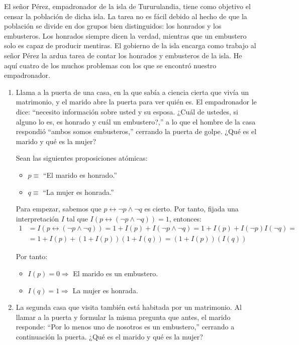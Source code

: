 \begin{ejercicio}\label{ej:1.4}
    El señor Pérez, empadronador de la isla de Tururulandia, tiene como objetivo el censar la población de dicha isla. La tarea no es fácil debido al hecho de que la población se divide en dos grupos bien distinguidos: los honrados y los embusteros. Los honrados siempre dicen la verdad, mientras que un embustero solo es capaz de producir mentiras. El gobierno de la isla encarga como trabajo al señor Pérez la ardua tarea de contar los honrados y embusteros de la isla.
    He aquí cuatro de los muchos problemas con los que se encontró nuestro empadronador.
    \begin{enumerate}
        \item Llama a la puerta de una casa, en la que sabía a ciencia cierta que vivía un matrimonio, y el marido abre la puerta para ver quién es. El empadronador le dice: ``necesito información sobre usted y su esposa. ¿Cuál de ustedes, si alguno lo es, es honrado y cuál un embustero?,'' a lo que el hombre de la casa respondió ``ambos somos embusteros,'' cerrando la puerta de golpe. ¿Qué es el marido y qué es la mujer?
        
        Sean las siguientes proposiciones atómicas:
        \begin{itemize}
            \item $p\equiv$ ``El marido es honrado.''
            \item $q\equiv$ ``La mujer es honrada.''
        \end{itemize}

        Para empezar, sabemos que $p\longleftrightarrow \neg p\land \neg q$ es cierto. Por tanto, fijada una interpretación $I$ tal que $I(p\longleftrightarrow (\neg p\land \neg q))=1$, entonces:
        \begin{align*}
            1 &= I(p\longleftrightarrow (\neg p\land \neg q))
            = 1+I(p) + I(\neg p\land \neg q)
            = 1+I(p) + I(\neg p)I(\neg q)
            =\\&= 1+I(p) + (1+I(p))(1+I(q))
            = (1+I(p))(I(q))
        \end{align*}

        Por tanto:
        \begin{itemize}
            \item $I(p) = 0\Longrightarrow$ El marido es un embustero.
            \item $I(q) = 1\Longrightarrow$ La mujer es honrada.
        \end{itemize}
        \item La segunda casa que visita también está habitada por un matrimonio. Al llamar a la puerta y formular la misma pregunta que antes, el marido responde: ``Por lo menos uno de nosotros es un embustero,'' cerrando a continuación la puerta. ¿Qué es el marido y qué es la mujer?
        

\end{enumerate}
\end{ejercicio}
